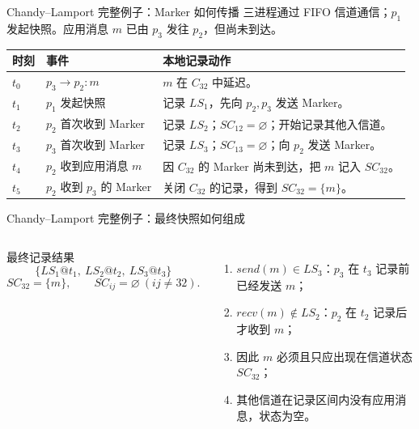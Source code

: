 \documentclass[UTF8,fontset=none,aspectratio=169,10pt]{beamer}
\begin{document}
\begin{frame}{Chandy--Lamport 完整例子：Marker 如何传播}
\small
三进程通过 FIFO 信道通信；$p_1$ 发起快照。应用消息 $m$ 已由 $p_3$ 发往 $p_2$，但尚未到达。
\begin{center}
\begin{tabularx}{.96\linewidth}{>{\bfseries}p{1.2cm}>{\raggedright\arraybackslash}p{3cm}>{\raggedright\arraybackslash}X}
\toprule
时刻 & 事件 & 本地记录动作 \\
\midrule
$t_0$ & $p_3\rightarrow p_2:m$ & $m$ 在 $C_{32}$ 中延迟。 \\
$t_1$ & $p_1$ 发起快照 & 记录 $LS_1$，先向 $p_2,p_3$ 发送 Marker。 \\
$t_2$ & $p_2$ 首次收到 Marker & 记录 $LS_2$；$SC_{12}=\varnothing$；开始记录其他入信道。 \\
$t_3$ & $p_3$ 首次收到 Marker & 记录 $LS_3$；$SC_{13}=\varnothing$；向 $p_2$ 发送 Marker。 \\
$t_4$ & $p_2$ 收到应用消息 $m$ & 因 $C_{32}$ 的 Marker 尚未到达，把 $m$ 记入 $SC_{32}$。 \\
$t_5$ & $p_2$ 收到 $p_3$ 的 Marker & 关闭 $C_{32}$ 的记录，得到 $SC_{32}=\{m\}$。 \\
\bottomrule
\end{tabularx}
\end{center}
\end{frame}

\begin{frame}{Chandy--Lamport 完整例子：最终快照如何组成}
\small
\begin{columns}[T,onlytextwidth]
\begin{block}{最终记录结果}
\[
\{LS_1@t_1,\ LS_2@t_2,\ LS_3@t_3\}
\]
\[
SC_{32}=\{m\},\qquad
SC_{ij}=\varnothing\ (ij\neq32).
\]
\end{block}
\begin{enumerate}
  \item $send(m)\in LS_3$：$p_3$ 在 $t_3$ 记录前已经发送 $m$；
  \item $recv(m)\notin LS_2$：$p_2$ 在 $t_2$ 记录后才收到 $m$；
  \item 因此 $m$ 必须且只应出现在信道状态 $SC_{32}$；
  \item 其他信道在记录区间内没有应用消息，状态为空。
\end{enumerate}
\end{columns}
\vfill
{}
\end{frame}
\end{document}
